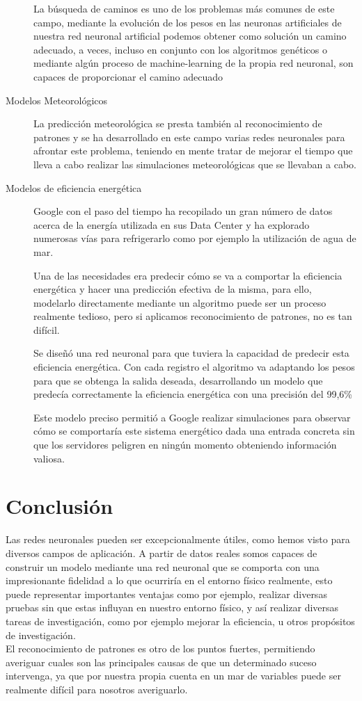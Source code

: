 \documentclass[11pt, oneside]{article}   	%
\begin{document}
\begin{description}
    La búsqueda de caminos es uno de los problemas más comunes de este campo, mediante la evolución de los pesos en las neuronas artificiales de nuestra red neuronal artificial podemos obtener como solución un camino adecuado, a veces, incluso en conjunto con los algoritmos genéticos o mediante algún proceso de machine-learning de la propia red neuronal, son capaces de proporcionar el camino adecuado\\

  \item[Modelos Meteorológicos]
    La predicción meteorológica se presta también al reconocimiento de patrones y se ha desarrollado en este campo  varias redes neuronales para afrontar este problema, teniendo en mente tratar de mejorar el tiempo que lleva a cabo realizar las simulaciones meteorológicas que se llevaban a cabo.\\

  \item[Modelos de eficiencia energética]
    Google con el paso del tiempo ha recopilado un gran número de datos acerca de la energía utilizada en sus Data Center y ha explorado numerosas vías para refrigerarlo como por ejemplo la utilización de agua de mar.

    Una de las necesidades era predecir cómo se va a comportar la eficiencia energética y hacer una predicción efectiva de la misma, para ello, modelarlo directamente mediante un algoritmo puede ser un proceso realmente tedioso, pero si aplicamos reconocimiento de patrones, no es tan difícil.

    Se diseñó una red neuronal para que tuviera la capacidad de predecir esta eficiencia energética. Con cada registro
    el algoritmo va adaptando los pesos para que se obtenga la salida deseada, desarrollando un modelo que predecía
    correctamente la eficiencia energética con una precisión del 99,6\%

    Este modelo preciso permitió a Google realizar simulaciones para observar cómo se comportaría este sistema energético
    dada una entrada concreta sin que los servidores peligren en ningún momento obteniendo información valiosa.

\end{description}

\section{Conclusión}
Las redes neuronales pueden ser excepcionalmente útiles, como hemos visto para diversos campos de aplicación. A partir
de datos reales somos capaces de construir un modelo mediante una red neuronal que se comporta con una impresionante
fidelidad a lo que ocurriría en el entorno físico realmente, esto puede representar importantes ventajas como por
ejemplo, realizar diversas pruebas sin que estas influyan en nuestro entorno físico, y así realizar diversas tareas de
investigación, como por ejemplo mejorar la eficiencia, u otros propósitos de investigación.\\

El reconocimiento de patrones es otro de los puntos fuertes, permitiendo averiguar cuales son las principales causas de
que un determinado suceso intervenga, ya que por nuestra propia cuenta en un mar de variables puede ser realmente
difícil para nosotros averiguarlo.\\
\end{document}
